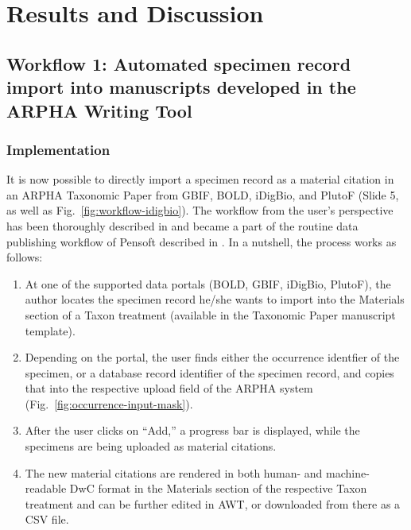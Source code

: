 \section{Results and Discussion}

\subsection{Workflow 1: Automated specimen record import into manuscripts developed in the ARPHA Writing Tool}

\subsubsection{Implementation}

It is now possible to directly import a specimen record as a material citation in an ARPHA Taxonomic Paper from GBIF, BOLD, iDigBio, and PlutoF (Slide 5, as well as Fig.~\ref{fig:workflow-idigbio}). The workflow from the user's perspective has been thoroughly described in \cite{senderov_online_2016} and became a part of the routine data publishing workflow of Pensoft described in \cite{penev_pensoft_2016}. In a nutshell, the process works as follows:

\begin{enumerate}
\item{At one of the supported data portals (BOLD, GBIF, iDigBio, PlutoF), the author locates the specimen record he/she wants to import into the Materials section of a Taxon treatment (available in the Taxonomic Paper manuscript template).}
\item{Depending on the portal, the user finds either the occurrence identfier of the specimen, or a database record identifier of the specimen record, and copies that into the respective upload field of the ARPHA system (Fig.~\ref{fig:occurrence-input-mask}).}
\item{After the user clicks on ``Add,'' a progress bar is displayed, while the specimens are being uploaded as material citations.}
\item{The new material citations are rendered in both human- and machine-readable DwC format in the Materials section of the respective Taxon treatment and can be further edited in AWT, or downloaded from there as a CSV file.}
\end{enumerate}

